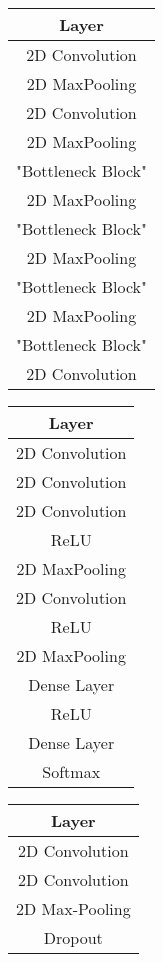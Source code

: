 \begin{table}[]
    \centering
    \begin{tabular}{|c|}
        \hline \textbf{Layer} \\\hline
        \hline 2D Convolution \\\hline
        2D MaxPooling  \\\hline
        2D Convolution \\\hline
        2D MaxPooling  \\\hline
        "Bottleneck Block" \\\hline
        2D MaxPooling  \\\hline
        "Bottleneck Block" \\\hline
        2D MaxPooling  \\\hline
        "Bottleneck Block" \\\hline
        2D MaxPooling  \\\hline
        "Bottleneck Block" \\\hline
        2D Convolution \\\hline
    \end{tabular}
    \quad
    \begin{tabular}{|c|}
        \hline \textbf{Layer} \\\hline
        \hline 2D Convolution \\\hline
        2D Convolution \\\hline
        2D Convolution  \\\hline
        ReLU \\\hline
        2D MaxPooling  \\\hline
        2D Convolution \\\hline
        ReLU  \\\hline
        2D MaxPooling  \\\hline
        Dense Layer \\\hline
        ReLU \\\hline
        Dense Layer \\\hline
        Softmax \\\hline
    \end{tabular}
    \quad
    \begin{tabular}{|c|}
        \hline \textbf{Layer} \\\hline
        \hline 2D Convolution \\\hline
        2D Convolution \\\hline
        2D Max-Pooling \\\hline
        Dropout \\\hline

\end{tabular}
\end{table}
